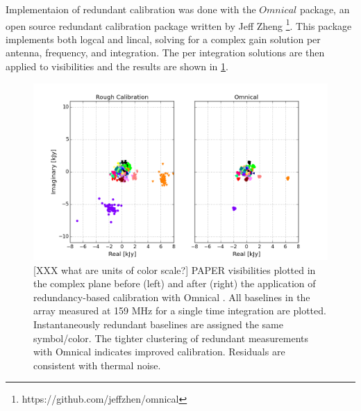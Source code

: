 \documentclass[twocolumn,numberedappendix]{emulateapj} \shorttitle{PSA64}
\begin{document}
%    
%       

Implementaion of redundant calibration was done with the ${Omnical}$ package, an
open source redundant calibration package written by Jeff Zheng
\footnote{https://github.com/jeffzhen/omnical}\citep{zheng_et_al2014}. This
package implements both logcal and lincal, solving for a complex gain solution
per antenna, frequency, and integration. The per integration solutions are then
applied to visibilities and the results are shown in \ref{fig:omniview}.

\begin{figure}
\centering
\includegraphics[width=1.5\columnwidth]{plots/omniview_64.png}
\caption{
[XXX what are units of color scale?]
PAPER visibilities plotted in the complex plane before (left) and after (right)
the application of redundancy-based calibration with Omnical \citep{zheng_et_al2014}.
All baselines in the array measured at 159 MHz for a single time integration are plotted.
Instantaneously redundant baselines are assigned the same symbol/color.
The tighter clustering of redundant measurements with Omnical indicates improved
calibration.  Residuals are consistent with thermal noise.
} \label{fig:omniview}
\end{figure}
\end{document}
